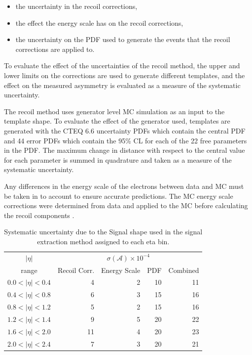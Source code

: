 \begin{itemize}
    \item the uncertainty in the recoil corrections,
    \item the effect the energy scale has on the recoil corrections,
    \item the uncertainty on the \ac{PDF} used to generate the events that the
recoil corrections are applied to.
\end{itemize}

To evaluate the effect of the uncertainties of the recoil method, the upper and
lower limits on the corrections are used to generate different templates, and
the effect on the measured asymmetry is evaluated as a measure of the
systematic uncertainty.

The recoil method uses generator level \ac{MC} simulation as an input to the
template shape. To evaluate the effect of the generator used, templates are
generated with the CTEQ 6.6 \cite{CTEQ}
uncertainty \acp{PDF} which contain the central \ac{PDF} and 44 error \acp{PDF}
which contain the \unit{95}{\%} \ac{CL} for each of the 22 free parameters in
the \ac{PDF}. The maximum change in distance with respect to the central value
for each parameter is summed in quadrature and taken as a measure of the
systematic uncertainty.

Any differences in the energy scale of the electrons between data and \ac{MC}
must be taken in to account to ensure accurate \ETm predictions. The \ac{MC} energy
scale corrections were determined from \PZ data and applied to the \PZ \ac{MC}
before calculating the recoil components \cite{recoil}.

\begin{table}[htbp]
\begin{center}
\begin{tabular}{crrrr}
    \toprule
$|\eta|$   & \multicolumn{4}{c}{$\sigma(\mathcal{A}) \times 10^{-4}$}\\
range      & Recoil Corr. & Energy Scale & PDF & Combined \\
\midrule
$0.0<|\eta|<0.4$ &  4 & 2 & 10  & 11 \\
$0.4<|\eta|<0.8$ &  6 & 3 & 15  & 16 \\
$0.8<|\eta|<1.2$ &  5 & 2 & 15  & 16 \\
$1.2<|\eta|<1.4$ &  9 & 5 & 20  & 22 \\
$1.6<|\eta|<2.0$ & 11 & 4 & 20  & 23 \\
$2.0<|\eta|<2.4$ &  7 & 3 & 20  & 21 \\
    \bottomrule
\end{tabular}
\caption{\label{tab:systSIG}Systematic uncertainty due to the Signal \ETm shape used in the signal
extraction method assigned to each eta bin.}
\end{center}
\end{table}

